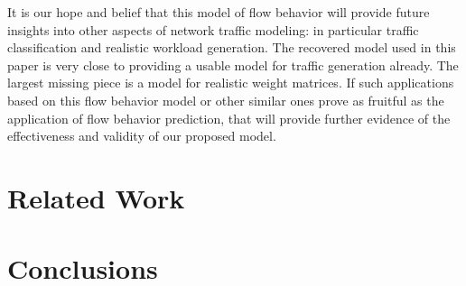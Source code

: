 \documentclass[conference]{IEEEtran}
\begin{document}
It is our hope and belief that this model of flow behavior will provide future insights into other aspects of network traffic modeling:
in particular traffic classification and realistic workload generation.
The recovered model used in this paper is very close to providing a usable model for traffic generation already.
The largest missing piece is a model for realistic weight matrices.
If such applications based on this flow behavior model or other similar ones prove as fruitful as the application of flow behavior prediction, that will provide further evidence of the effectiveness and validity of our proposed model.


\section{Related Work}

\section{Conclusions}


\end{document}
